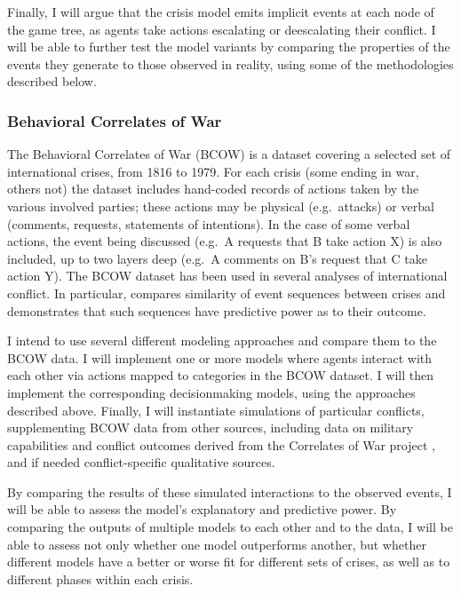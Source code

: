 Finally, I will argue that the crisis model emits implicit events at each node of the game tree, as agents take actions escalating or deescalating their conflict. I will be able to further test the model variants by comparing the properties of the events they generate to those observed in reality, using some of the methodologies described below.

\subsubsection{Behavioral Correlates of War}\label{behavioral-correlates-of-war}

The Behavioral Correlates of War (BCOW) \citep{leng_1987} is a dataset covering a selected set of international crises, from 1816 to 1979. For each crisis (some ending in war, others not) the dataset includes hand-coded records of actions taken by the various involved parties; these actions may be physical (e.g.~attacks) or verbal (comments, requests, statements of intentions). In the case of some verbal actions, the event being discussed (e.g.~A requests that B take action X) is also included, up to two layers deep (e.g.~A comments on B's request that C take action Y). The BCOW dataset has been used in several analyses of international conflict. In particular, \citet{schrodt_2004} compares similarity of event sequences between crises and demonstrates that such sequences have predictive power as to their outcome.

I intend to use several different modeling approaches and compare them to the BCOW data. I will implement one or more models where agents interact with each other via actions mapped to categories in the BCOW dataset. I will then implement the corresponding decisionmaking models, using the approaches described above. Finally, I will instantiate simulations of particular conflicts, supplementing BCOW data from other sources, including data on military capabilities and conflict outcomes derived from the Correlates of War project \citep{sarkees_2010}, and if needed conflict-specific qualitative sources.

By comparing the results of these simulated interactions to the observed events, I will be able to assess the model's explanatory and predictive power. By comparing the outputs of multiple models to each other and to the data, I will be able to assess not only whether one model outperforms another, but whether different models have a better or worse fit for different sets of crises, as well as to different phases within each crisis.

